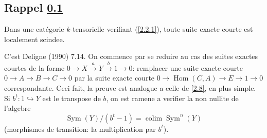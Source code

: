 \documentclass[11pt,a4paper]{article}
\theoremstyle{plain}
\theoremstyle{definition}
\DeclareMathOperator{\Hom}{Hom}
\DeclareMathOperator{\Sym}{Sym}
\DeclareMathOperator*{\colim}{colim}
\begin{document}
\subsection{Rappel \ref{2.10}}\label{2.10}

Dans une cat\'egorie $k$-tensorielle verifiant (\ref{2.2.1}), toute suite exacte courte est localement scindee.

C'est Deligne (1990) 7.14. On commence par se reduire au cas des suites exactes courtes de la forme $0\to X\xrightarrow{a}Y\xrightarrow{b}1\to0$: remplacer une suite exacte courte $0\to A\to B\to C\to0$ par la suite exacte courte $0\to\Hom(C,A)\to E\to1\to0$ correspondante. Ceci fait, la preuve est analogue a celle de \ref{2.8}, en plus simple. Si $b^t:1\hookrightarrow Y$ est le transpose de $b$, on est ramene a verifier la non nullite de l'algebre
\[
\Sym(Y)/(b^t-1)=\colim\Sym^n(Y)
\]
(morphismes de transition: la multiplication par $b^t$).
\end{document}
